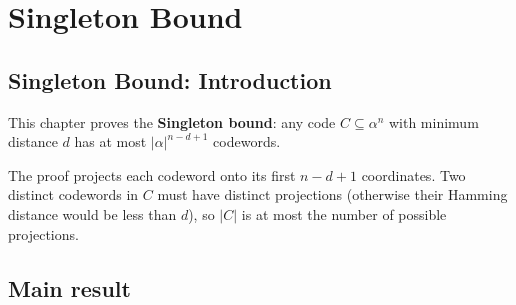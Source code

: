 \section{Singleton Bound}
\subsection*{Singleton Bound: Introduction}

This chapter proves the \textbf{Singleton bound}: any code $C\subseteq\alpha^n$ with
minimum distance $d$ has at most $|\alpha|^{n-d+1}$ codewords.

The proof projects each codeword onto its first $n-d+1$ coordinates.  Two distinct
codewords in $C$ must have distinct projections (otherwise their Hamming distance
would be less than $d$), so $|C|$ is at most the number of possible projections.

\subsection{Main result}

